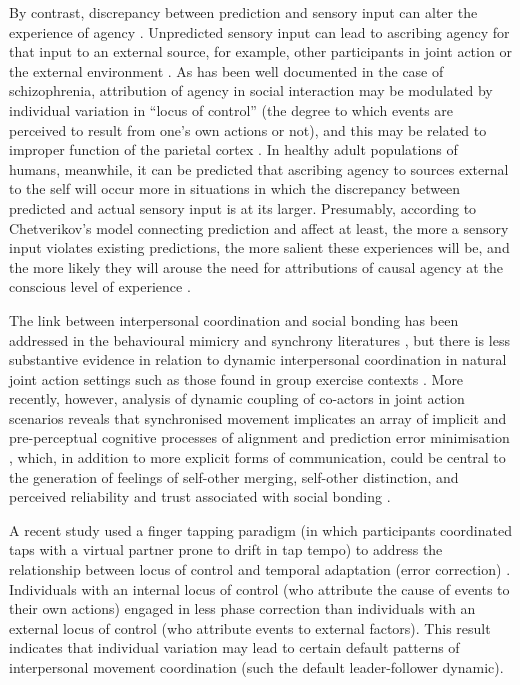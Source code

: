 \begin{CJK}{UTF8}{gbsn}
By contrast, discrepancy between prediction and sensory input can alter the experience of agency \citep{Sato2008}.  Unpredicted sensory input can lead to ascribing agency for that input to an external source, for example, other participants in joint action or the external environment \citep{Sato2005,Frith2007}.  As has been well documented in the case of schizophrenia, attribution of agency in social interaction may be modulated by individual variation in ``locus of control'' (the degree to which events are perceived to result from one’s own actions or not), and this may be related to improper function of the parietal cortex \citep{Frith2000}. In healthy adult populations of humans, meanwhile, it can be predicted that ascribing agency to sources external to the self will occur more in situations in which the discrepancy between predicted and actual sensory input is at its larger.  Presumably, according to Chetverikov's model connecting prediction and affect at least, the more a sensory input violates existing predictions, the more salient these experiences will be, and the more likely they will arouse the need for attributions of causal agency at the conscious level of experience \citep{Pesquita2017}.

The link between interpersonal coordination and social bonding has been addressed in the behavioural mimicry and synchrony literatures \citep[e.g.,][]{Wheatley2012,Launay2016,Mogan2017}, but there is less substantive evidence in relation to dynamic interpersonal coordination in natural joint action settings such as those found in group exercise contexts \citep{Marsh2009,Miles2009,Lumsden2012}.  More recently, however, analysis of dynamic coupling of co-actors in joint action scenarios reveals that synchronised movement implicates an array of implicit and pre-perceptual cognitive processes of alignment and prediction error minimisation \citep{Schmidt2011}, which, in addition to more explicit forms of communication, could be central to the generation of feelings of self-other merging, self-other distinction, and perceived reliability and trust associated with social bonding \citep{Marsh2009}.

A recent study used a finger tapping paradigm (in which participants coordinated taps with a virtual partner prone to drift in tap tempo) to address the relationship between locus of control and temporal adaptation (error correction) \citep{Fairhurst2014}.  Individuals with an internal locus of control (who attribute the cause of events to their own actions) engaged in less phase correction than individuals with an external locus of control (who attribute events to external factors). This result indicates that individual variation may lead to certain default patterns of interpersonal movement coordination (such the default leader-follower dynamic).




\end{CJK}

